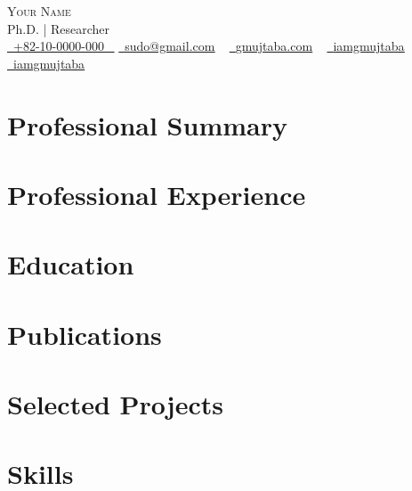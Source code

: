 \documentclass[letter,10pt]{article}
\begin{document}
\begin{center}
    {\Huge \scshape Your Name} \\ \vspace{1pt}
    {\Large Ph.D. | Researcher} \\ \vspace{1pt}
    \small \href{tel:+82-10-0000-000}{ \raisebox{-0.1\height}\faPhone\ \underline{+82-10-0000-000} ~} \href{mailto:sudo@gmail.com}{\raisebox{-0.2\height}\faEnvelope\  \underline{sudo@gmail.com}} ~ 
    \href{https://www.gmujtaba.com/}{\raisebox{-0.2\height}\Mundus\  \underline{gmujtaba.com}} ~ 
    \href{https://www.linkedin.com/in/iamgmujtaba}{\raisebox{-0.2\height}\faLinkedin\ \underline{iamgmujtaba}} ~
    \href{https://github.com/iamgmujtaba}{\raisebox{-0.2\height}\faGithub\ \underline{iamgmujtaba}} ~
    \vspace{-8pt}
\end{center}

\vspace*{7pt}



\section{Professional Summary}


\thispagestyle{empty}

\section{Professional Experience}


\section{Education}


\section{Publications}


\section{Selected Projects}


\section{Skills}

\end{document}
